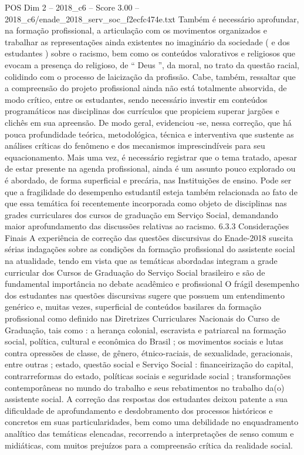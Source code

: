 \begin{textsample}{POS Dim 2 – 2018\_c6 – Score 3.00 – 2018\_c6/enade\_2018\_serv\_soc\_f2ecfc474e.txt}
Também é necessário aprofundar, na formação profissional, a articulação com os movimentos organizados e trabalhar as representações ainda existentes no imaginário da sociedade ( e dos estudantes ) sobre o racismo, bem como os conteúdos valorativos e religiosos que evocam a presença do religioso, de “ Deus ”, da moral, no trato da questão racial, colidindo com o processo de laicização da profissão.
Cabe, também, ressaltar que a compreensão do projeto profissional ainda não está totalmente absorvida, de modo crítico, entre os estudantes, sendo necessário investir em conteúdos programáticos nas disciplinas dos currículos que propiciem superar jargões e clichês em sua apreensão.
De modo geral, evidenciou -se, nessa correção, que há pouca profundidade teórica, metodológica, técnica e interventiva que sustente as análises críticas do fenômeno e dos mecanismos imprescindíveis para seu equacionamento.
Mais uma vez, é necessário registrar que o tema tratado, apesar de estar presente na agenda profissional, ainda é um assunto pouco explorado ou é abordado, de forma superficial e precária, nas Instituições de ensino.
Pode ser que a fragilidade do desempenho estudantil esteja também relacionada ao fato de que essa temática foi recentemente incorporada como objeto de disciplinas nas grades curriculares dos cursos de graduação em Serviço Social, demandando maior aprofundamento das discussões relativas ao racismo. 6.3.3 Considerações Finais A experiência de correção das questões discursivas do Enade-2018 suscita sérias indagações sobre as condições da formação profissional do assistente social na atualidade, tendo em vista que as temáticas abordadas integram a grade curricular dos Cursos de Graduação do Serviço Social brasileiro e são de fundamental importância no debate acadêmico e profissional O frágil desempenho dos estudantes nas questões discursivas sugere que possuem um entendimento genérico e, muitas vezes, superficial de conteúdos basilares da formação profissional como definido nas Diretrizes Curriculares Nacionais do Curso de Graduação, tais como : a herança colonial, escravista e patriarcal na formação social, política, cultural e econômica do Brasil ; os movimentos sociais e lutas contra opressões de classe, de gênero, étnico-raciais, de sexualidade, geracionais, entre outras ; estado, questão social e Serviço Social : financeirização do capital, contrarreformas do estado, políticas sociais e seguridade social ; transformações contemporâneas no mundo do trabalho e seus rebatimentos no trabalho da(o) assistente social.
A correção das respostas dos estudantes deixou patente a sua dificuldade de aprofundamento e desdobramento dos processos históricos e concretos em suas particularidades, bem como uma debilidade no enquadramento analítico das temáticas elencadas, recorrendo a interpretações de senso comum e midiáticas, com muitos prejuízos para a compreensão crítica da realidade social.

\end{textsample}
